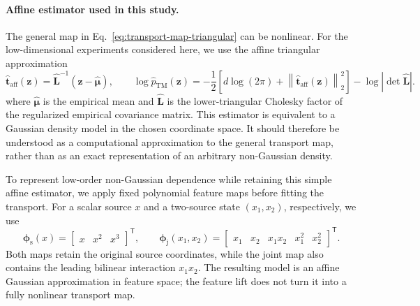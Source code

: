 \documentclass[fleqn,10pt]{wlscirep}
\begin{document}
\paragraph{Affine estimator used in this study.}
The general map in Eq.~\eqref{eq:transport-map-triangular} can be nonlinear.  For
the low-dimensional experiments considered here, we use the affine
triangular approximation
\begin{equation}
\widehat{\boldsymbol{t}}_{\mathrm{aff}}(\boldsymbol{z})
=
\widehat{\mathbf{L}}^{-1}
\left(
\boldsymbol{z}-\widehat{\boldsymbol{\mu}}
\right),
\qquad
\log\widehat p_{\mathrm{TM}}(\boldsymbol{z})
=
-\frac{1}{2}
\left[
d\log(2\pi)
+
\left\|
\widehat{\boldsymbol{t}}_{\mathrm{aff}}(\boldsymbol{z})
\right\|_2^2
\right]
-
\log\left|\det\widehat{\mathbf{L}}\right|.
\label{eq:affine-transport-density}
\end{equation}
where \(\widehat{\boldsymbol{\mu}}\) is the empirical mean and
\(\widehat{\mathbf{L}}\) is the lower-triangular Cholesky factor of the
regularized empirical covariance matrix.  This estimator is equivalent to a
Gaussian density model in the chosen coordinate space.  It should therefore
be understood as a computational approximation to the general transport
map, rather than as an exact representation of an arbitrary non-Gaussian
density.

To represent low-order non-Gaussian dependence while retaining this simple
affine estimator, we apply fixed polynomial feature maps before fitting the
transport.  For a scalar source \(x\) and a two-source state
\((x_1,x_2)\), respectively, we use
\begin{equation}
\boldsymbol{\phi}_{\mathrm{s}}(x)
=
\begin{bmatrix}
x & x^2 & x^3
\end{bmatrix}^{\mathsf T},
\qquad
\boldsymbol{\phi}_{\mathrm{j}}(x_1,x_2)
=
\begin{bmatrix}
x_1 & x_2 & x_1x_2 & x_1^2 & x_2^2
\end{bmatrix}^{\mathsf T}.
\label{eq:transport-feature-maps}
\end{equation}
Both maps retain the original source coordinates, while the joint map also
contains the leading bilinear interaction \(x_1x_2\).  The resulting model is
an affine Gaussian approximation in feature space; the feature lift does not
turn it into a fully nonlinear transport map.
\end{document}
